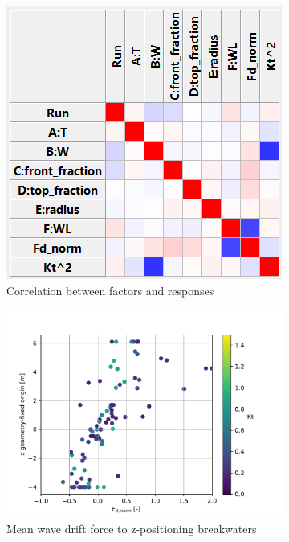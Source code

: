 \begin{figure}[h]
    \centering
    \begin{subfigure}[b]{0.34\textwidth}
        \centering
        \includegraphics[width=\textwidth]{figures/ComFLOW/Results DI1 WC2 captive/correlation_H9.png}
        \caption[]%
        {{\small Correlation between factors and responses}}    
        \label{fig: correlation H9 DI1 captive}
    \end{subfigure}
    \hfill
    \begin{subfigure}[b]{0.49\textwidth}
        \centering 
        \includegraphics[width=\textwidth]{figures/ComFLOW/Results DI1 WC2 captive/Fd_norm_VS_top_bw_with_Kt.pdf}
        \caption[]%
        {{\small Mean wave drift force to z-positioning breakwaters}}    
        \label{fig: Fd_norm_VS_top_bw_with_Kt H9 captive}
    \end{subfigure}

    \caption{}
    \label{fig: }
\end{figure}




